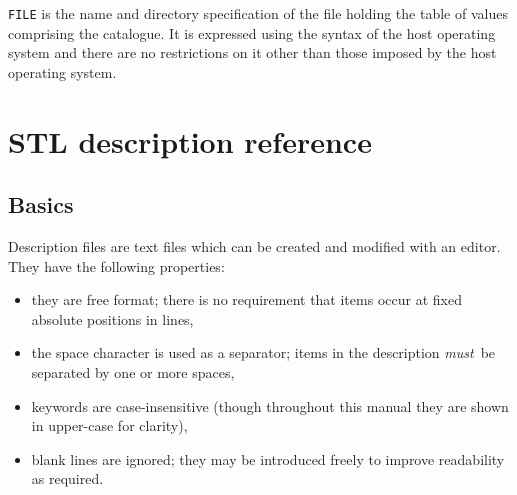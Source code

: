 \documentclass[twoside,11pt]{article}
\newcommand{\xlabel}[1]{}
\renewcommand{\_}{\texttt{\symbol{95}}}
\begin{document}
\begin{itemize}
   {\tt FILE} is the name and directory specification of the file
   holding the table of values comprising the catalogue.  It is
   expressed using the syntax of the host operating system and there
   are no restrictions on it other than those imposed by the host
   operating system.


\end{itemize}


\section{\xlabel{STLREF}\label{STLREF}STL description reference}

\subsection{Basics}

Description files are text files which can be created and modified
with an editor.  They have the following properties:

\begin{itemize}

  \item they are free format; there is no requirement that items occur
   at fixed absolute positions in lines,

  \item the space character is used as a separator; items in the
   description {\it must}\, be separated by one or more spaces,

  \item keywords are case-insensitive (though throughout this manual they
   are shown in upper-case for clarity),

  \item blank lines are ignored; they may be introduced freely to
   improve readability as required.

\end{itemize}
\end{document}
